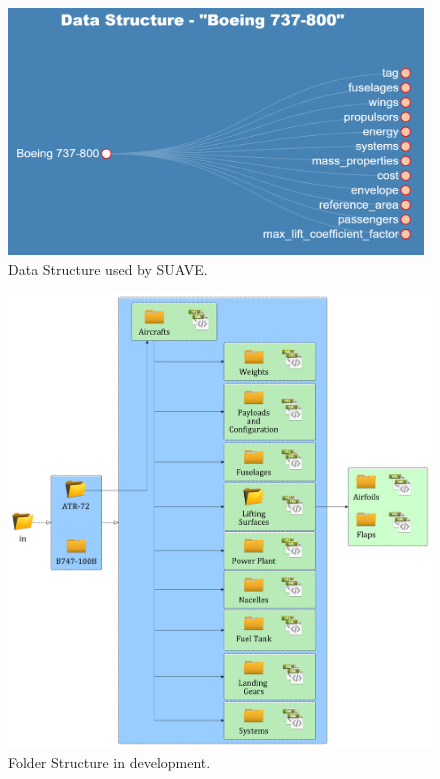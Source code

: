 \begin{figure}[H]
\centering
	\includegraphics[width=11cm]{Immagini/suave/flowchartBoeing1}
	\caption{Data Structure used by SUAVE.}
	\label{fig:suave1}
\end{figure}

%



\begin{figure}[H]
\centering
	\includegraphics[width=11 cm]{Immagini/Folder_Tree}
		\caption{Folder Structure in development.}
		\label{fig:suave3}
\end{figure}


